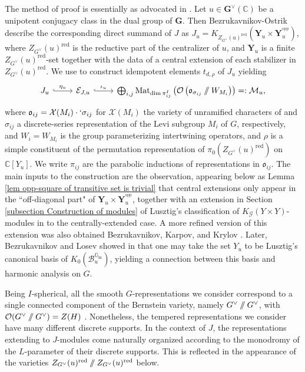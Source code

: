 \documentclass[10pt]{article}
\DeclareMathOperator{\Mat}{Mat}
\newcommand{\opp}{^\mathrm{opp}}
\newcommand{\git}{\mathbin{
  \mathchoice{/\mkern-6mu/}%
    {/\mkern-6mu/}%
    {/\mkern-5mu/}%
    {/\mkern-5mu/}}}%
\newcommand{\Bb}{\mathcal{B}}
\newcommand{\X}{\mathcal{X}}
\newcommand{\C}{\mathbb{C}}
\newcommand{\Oo}{\mathcal{O}}
\newcommand{\G}{\mathbf{G}}
\newcommand{\Gm}{{\mathbb{G}_\mathrm{m}}}
\theoremstyle{definition}
\theoremstyle{remark}
\newcommand{\Zur}{Z_{G^\vee}(u)^{\mathrm{red}}}
\newcommand{\Yext}{\mathbf{Y}}
\newcommand{\Zz}{\mathcal{G}}
\newcommand{\Y}{\mathbf{Y}}
\begin{document}
The method of proof is essentially as advocated in \cite{BK}. Let $u\in\G^\vee(\C)$ be a unipotent conjugacy class in the dual group of $\G$. Then Bezrukavnikov-Ostrik \cite{BO} describe the corresponding direct 
summand of $J$ as $J_u=K_{\Zur}(\Y_u\times\Y_u^{\opp})$, where $\Zur$ is the reductive part of the centralizer of $u$,
and $\Y_u$ is a finite $\Zur$-set together with the data of a central extension of each stabilizer in $\Zur$. 
We use \cite{BO} to construct idempotent elements 
$t_{d,\rho}$ of $J_u$ yielding 
%
\begin{equation}
\label{eqn lower modification intro}
\begin{tikzcd}
J_u\arrow[r, "\eta_u", hook]&\mathcal{E}_{J,u}\arrow[r, "\iota_u", hook]&\bigoplus_{i,j}\Mat_{\dim\pi_{ij}^I}\left(\Oo\left(\mathfrak{o}_{\sigma_{ij}}\git W_{M_i}\right)\right)=:\mathcal{M}_u,
\end{tikzcd}
\end{equation}
%
where $\mathfrak{o}_{ij}=\X(M_i)\cdot`\sigma_{ij}$ for $\X(M_i)$ the variety of unramified characters of and $\sigma_{ij}$ a discrete-series representation of the Levi subgroup $M_i$ of $G$, respectively, and $W_i=W_{M_i}$ 
is the group parameterizing intertwining operators, and $\rho$ is a simple constituent of the permutation 
representation of $\pi_0(\Zur)$ on $\C[Y_u]$. We write $\pi_{ij}$ are the parabolic inductions of representations in $\mathfrak{o}_{ij}$. The main inputs to the construction are the observation, appearing 
below as Lemma \ref{lem opp-square of transitive set is trivial} that central extensions only appear in 
the ``off-diagonal part" of $\Yext_u\times\Yext_u^{\opp}$, together with an extension in Section \ref{subsection Construction of modules} of Lusztig's classification 
of $K_{\Zz}(Y\times Y)$-modules in \cite[Section 10]{cellsIV} to the centrally-extended case. 
A more refined version of this extension was also obtained Bezrukavnikov, Karpov, and Krylov
\cite[Thm. C]{BKK}. Later, Bezrukavnikov and Losev showed in \cite{BL} that one may take the set $Y_u$ to 
be Lusztig's canonical basis of $K_0(\Bb_u^{\Gm})$, yielding a connection between this basis and harmonic 
analysis on $G$. 

Being $I$-spherical, all the smooth $G$-representations we consider correspond to a single connected component of the Bernstein variety, namely $G^\vee\git G^\vee$, with $\Oo(G^\vee\git G^\vee)=Z(H)$ . Nonetheless, the tempered representations we consider have many different discrete supports. In the context of $J$, the representations extending to $J$-modules come naturally organized according to the monodromy of the $L$-parameter of their discrete supports. This is reflected in the appearance of the varieties $\Zur\git\Zur$ below.
\end{document}
